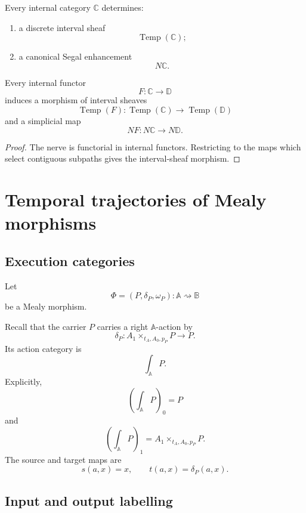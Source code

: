 \begin{theorem}
\label{thm:segal-enhancement}
Every internal category \(\mathbb C\) determines:
\begin{enumerate}
    \item a discrete interval sheaf
    \[
        \operatorname{Temp}(\mathbb C);
    \]
    \item a canonical Segal enhancement
    \[
        N\mathbb C.
    \]
\end{enumerate}
Every internal functor
\[
    F:\mathbb C\to\mathbb D
\]
induces a morphism of interval sheaves
\[
    \operatorname{Temp}(F):
    \operatorname{Temp}(\mathbb C)
    \to
    \operatorname{Temp}(\mathbb D)
\]
and a simplicial map
\[
    NF:N\mathbb C\to N\mathbb D.
\]
\end{theorem}

\begin{proof}
The nerve is functorial in internal functors. Restricting to the maps which
select contiguous subpaths gives the interval-sheaf morphism.
\end{proof}

\section{Temporal trajectories of Mealy morphisms}
\label{sec:temporal-trajectories-mealy}

\subsection{Execution categories}
\label{subsec:execution-categories-temporal}

Let
\[
    \Phi=(P,\delta_P,\omega_P):
    \mathbb A\rightsquigarrow\mathbb B
\]
be a Mealy morphism.

Recall that the carrier \(P\) carries a right \(\mathbb A\)-action by
\[
    \delta_P:
    A_1\times_{t_A,A_0,p_P}P\to P.
\]
Its action category is
\[
    \int_{\mathbb A}P.
\]
Explicitly,
\[
    \left(\int_{\mathbb A}P\right)_0=P
\]
and
\[
    \left(\int_{\mathbb A}P\right)_1
    =
    A_1\times_{t_A,A_0,p_P}P.
\]
The source and target maps are
\[
    s(a,x)=x,
    \qquad
    t(a,x)=\delta_P(a,x).
\]

\subsection{Input and output labelling}
\label{subsec:input-output-labelling-temporal}

